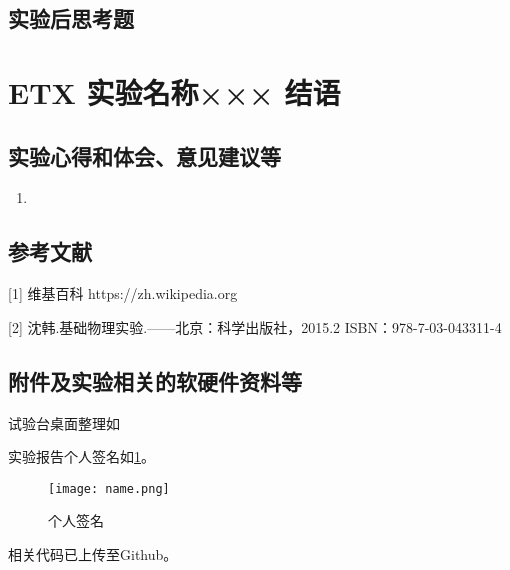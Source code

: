 \documentclass[dvipsnames, svgnames,a4paper,11pt]{article}
\begin{document}
	\subsection{实验后思考题}
	
	\begin{question}
		
	\end{question}
	
	\begin{question}
		
	\end{question}
	
	\begin{question}
		
	\end{question}
	
	
	
	\clearpage
	
	\section{ETX 实验名称××× \quad\heiti 结语}
	
	\subsection{实验心得和体会、意见建议等}
	\begin{enumerate}
		\item 
	\end{enumerate}
	
	\subsection{参考文献}
	[1] 维基百科 https://zh.wikipedia.org
	
	[2] 沈韩.基础物理实验.——北京：科学出版社，2015.2 ISBN：978-7-03-043311-4
	
	
	\subsection{附件及实验相关的软硬件资料等}
	试验台桌面整理如%
	
	实验报告个人签名如\cref{fig:name}。
	
	\begin{figure}[htbp]
		\centering
		\texttt{[image: name.png]}
		\caption{个人签名}
		\label{fig:name}
	\end{figure}
	
	
	相关代码已上传至Github。
	
	
	
\end{document}
